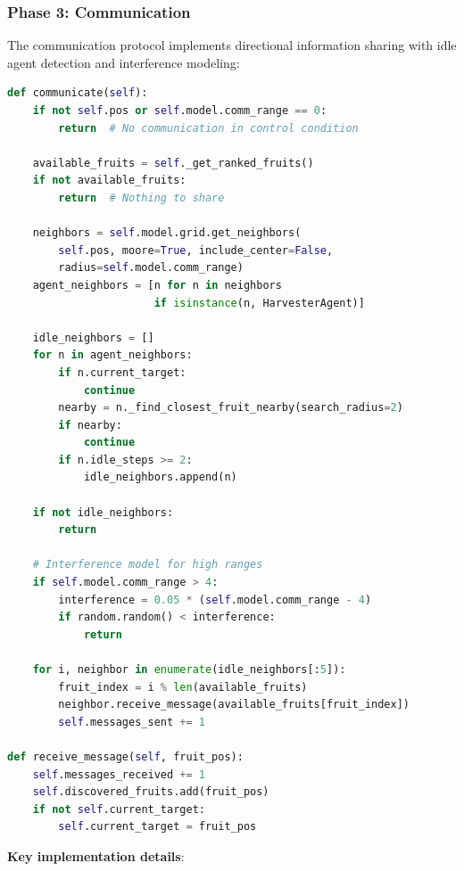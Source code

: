 \subsubsection{Phase 3: Communication}

The communication protocol implements directional information sharing with idle agent detection and interference modeling:

\begin{lstlisting}[language=Python, caption=Communication protocol]
def communicate(self):
    if not self.pos or self.model.comm_range == 0:
        return  # No communication in control condition

    available_fruits = self._get_ranked_fruits()
    if not available_fruits:
        return  # Nothing to share

    neighbors = self.model.grid.get_neighbors(
        self.pos, moore=True, include_center=False,
        radius=self.model.comm_range)
    agent_neighbors = [n for n in neighbors
                       if isinstance(n, HarvesterAgent)]

    idle_neighbors = []
    for n in agent_neighbors:
        if n.current_target:
            continue
        nearby = n._find_closest_fruit_nearby(search_radius=2)
        if nearby:
            continue
        if n.idle_steps >= 2:
            idle_neighbors.append(n)

    if not idle_neighbors:
        return

    # Interference model for high ranges
    if self.model.comm_range > 4:
        interference = 0.05 * (self.model.comm_range - 4)
        if random.random() < interference:
            return

    for i, neighbor in enumerate(idle_neighbors[:5]):
        fruit_index = i % len(available_fruits)
        neighbor.receive_message(available_fruits[fruit_index])
        self.messages_sent += 1

def receive_message(self, fruit_pos):
    self.messages_received += 1
    self.discovered_fruits.add(fruit_pos)
    if not self.current_target:
        self.current_target = fruit_pos
\end{lstlisting}

\textbf{Key implementation details}:

